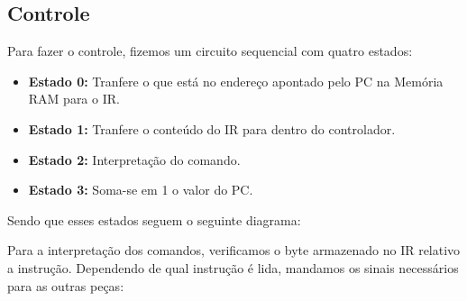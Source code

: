 \documentclass[11pt]{article}
\begin{document}
\subsection{Controle}

Para fazer o controle, fizemos um circuito sequencial com quatro estados:

\begin{itemize}

\item \textbf{Estado 0:} Tranfere o que está no endereço apontado pelo PC na Memória RAM para o IR.

\item \textbf{Estado 1:} Tranfere o conteúdo do IR para dentro do controlador.

\item \textbf{Estado 2:} Interpretação do comando.

\item \textbf{Estado 3:} Soma-se em 1 o valor do PC.

\end{itemize}

Sendo que esses estados seguem o seguinte diagrama:
\begin{figure}[!hbtp]
\centering




\end{figure}	

Para a interpretação dos comandos, verificamos o byte armazenado no IR relativo a instrução. Dependendo de qual instrução é lida, mandamos os sinais necessários para as outras peças:
\end{document}
